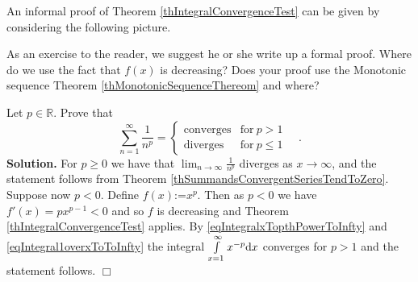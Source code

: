 \documentclass[12pt]{book}
\renewcommand{\optionalDisplay}[1]{}
\newcommand{\eqdef}{\textbf{:=}}
\newenvironment{solution}{\medskip\noindent\textbf{Solution.} }{$\Box$}
\newcommand{\doublebrace}[4]{\left\{\begin{array}{ll} #1 & #2 \\#3 & #4  \end{array} \right.}
\begin{document}
An informal proof of Theorem \ref{thIntegralConvergenceTest} can be given by considering the following picture.
\optionalDisplay{
\psset{xunit=0.6cm,yunit=0.6cm}

\begin{pspicture}(-1,-1)(9.5,6)

\rput(5.5,4){$\underbrace{ \int\limits_{1}^\infty f(x) \diff x}_{\mathrm{region~under~curve}} \geq\underbrace{ \sum\limits_{n=2}^{\infty} f(n)}_{\mathrm{blue~region}}$}

\psaxes[labels=x, ticks=x]{<->}(0,0)(-1,-1)(9,6)

\pscustom[fillstyle=solid, linestyle=none,fillcolor=gray!30]{
\psplot{1}{9}{ 5 x  div}
\psline[linestyle=none](9, 0)(1,0)
}
\psplot[linewidth=1pt]{1}{9}{ 5 x  div}

\multido{\ra=1.0+1.0}{8}{%
\psframe[fillstyle=solid, fillcolor=cyan!40](\ra,0)(! \ra\space 1 add \space 5 \ra\space 1 add div )
}
\end{pspicture}
\begin{pspicture}(-1,-1)(9,6)
\psaxes[labels=x, ticks=x]{<->}(0,0)(-1,-1)(9,6)
\rput(5.5,4){$\underbrace{ \int\limits_{1}^\infty f(x) \diff x}_{\mathrm{region~under~curve}}\leq\underbrace{ \sum\limits_{n=1}^{\infty} f(n)}_{\mathrm{blue~region}}$}

\multido{\ra=1.0+1.0}{8}{%
\psframe[fillstyle=solid, fillcolor=cyan!40](\ra,0)(! \ra\space 1 add \space 5 \ra\space div )
}
\psplot[linewidth=1pt]{1}{9}{ 5 x  div}
\end{pspicture}
} %

As an exercise to the reader, we suggest he or she write up a formal proof. Where do we use the fact that $f(x)$ is decreasing? Does your proof use the Monotonic sequence Theorem \ref{thMonotonicSequenceThereom} and where?

Let $p\in \mathbb R$. Prove that
\begin{equation}\label{eqSumnToThePthConverges}
\sum\limits_{n=1}^{\infty} \frac{1}{n^p}= \doublebrace{\mathrm{converges}}{\mathrm{for~}p>1}{\mathrm{diverges}}{\mathrm{for~}p\leq 1}\quad .
\end{equation}
\begin{solution}
For $p\geq 0$ we have that $\lim_{n\to \infty} \frac{1}{n^p}$ diverges as $x\to \infty$, and the statement follows from Theorem \ref{thSummandsConvergentSeriesTendToZero}. Suppose now $p< 0$. Define $f(x)\eqdef x^{p}$. Then as $p<0$ we have $f'(x)= px^{p-1}<0$ and so $f$ is decreasing and Theorem \ref{thIntegralConvergenceTest} applies. By \eqref{eqIntegralxTopthPowerToInfty} and \eqref{eqIntegral1overxToToInfty}  the integral $\int\limits_{x=1}^{\infty} x^{-p}{\normalfont \text{d}} x$ converges for $p>1$ and the statement follows.
\end{solution}
\end{document}

